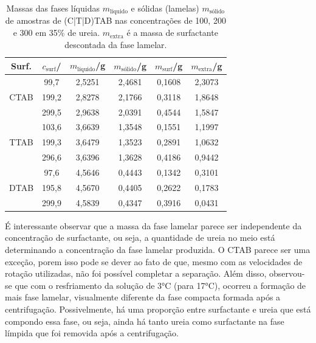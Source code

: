 	\begin{table}[H]
		\IBGEtab%
		{
			\caption{Massas das fases líquidas $m_{\text{líquido}}$ e sólidas (lamelas) $m_{\text{sólido}}$ de amostras de (C|T|D)TAB nas concentrações de 100, 200 e 300 \mM{} em 35\% de ureia. $m_{\text{extra}}$ é a massa de surfactante descontada da fase lamelar.}
			
			\label{tab:SAXS_centrifug_ur35}
		}
		{
			\begin{tabular}{c c | c c c c}
				\toprule
				        Surf.         & $c_{\text{surf}}$/\mM & $m_{\text{líquido}}$/g & $m_{\text{sólido}}$/g & $m_{\text{surf}}$/g & $m_{\text{extra}}$/g \\ \midrule
				\multirow{3}{*}{CTAB} & 99,7                  & 2,5251                 & 2,4681                & 0,1608              & 2,3073               \\
				                      & 199,2                 & 2,8278                 & 2,1766                & 0,3118              & 1,8648               \\
				                      & 299,5                 & 2,9638                 & 2,0391                & 0,4544              & 1,5847               \\ \midrule
				\multirow{3}{*}{TTAB} & 103,6                 & 3,6639                 & 1,3548                & 0,1551              & 1,1997               \\
				                      & 199,3                 & 3,6479                 & 1,3523                & 0,2891              & 1,0632               \\
				                      & 296,6                 & 3,6396                 & 1,3628                & 0,4186              & 0,9442               \\ \midrule
				\multirow{3}{*}{DTAB} & 97,6                  & 4,5646                 & 0,4443                & 0,1342              & 0,3101               \\
				                      & 195,8                 & 4,5670                 & 0,4405                & 0,2622              & 0,1783               \\
				                      & 299,9                 & 4,5839                 & 0,4347                & 0,3916              & 0,0431               \\ \bottomrule
			\end{tabular}
		}
		{}
	\end{table}
	
	É interessante observar que a massa da fase lamelar parece ser independente da concentração de surfactante, ou seja, a quantidade de ureia no meio está determinando a concentração da fase lamelar produzida. O CTAB parece ser uma exceção, porem isso pode se dever ao fato de que, mesmo com as velocidades de rotação utilizadas, não foi possível completar a separação. Além disso, observou-se que com o resfriamento da solução de 3°C (para 17°C), ocorreu a formação de mais fase lamelar, visualmente diferente da fase compacta formada após a centrifugação. Possivelmente, há uma proporção entre surfactante e ureia que está compondo essa fase, ou seja, ainda há tanto ureia como surfactante na fase límpida que foi removida após a centrifugação.
	

